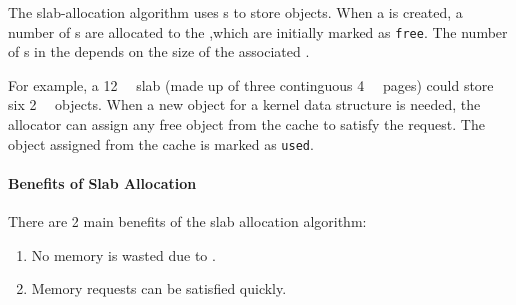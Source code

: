 The slab-allocation algorithm uses s to store  objects.
When a  is created, a number of s are allocated to the ,which are initially marked as \texttt{free}.
The number of s in the  depends on the size of the associated .

For example, a \SI{12}{\kibi{} \byte{}} slab (made up of three continguous \SI{4}{\kibi{} \byte{}} pages) could store six \SI{2}{\kibi{} \byte{}} objects.
When a new object for a kernel data structure is needed, the allocator can assign any free object from the cache to satisfy the request.
The object assigned from the cache is marked as \texttt{used}.

\paragraph{Benefits of Slab Allocation}\label{subsubsec:Slab_Allocation_Benefits}
There are 2 main benefits of the slab allocation algorithm:
\begin{enumerate}[noitemsep]
\item No memory is wasted due to .
\item Memory requests can be satisfied quickly.
\end{enumerate}

